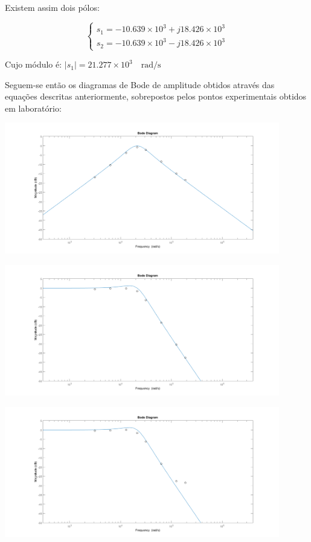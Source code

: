 \documentclass[a4paper,11pt]{report}
\begin{document}
Existem assim dois pólos:

$$
\begin{cases}
s_1=-10.639\times 10^3+j18.426\times 10^3\\
s_2=-10.639\times 10^3-j18.426\times 10^3
\end{cases}
$$

Cujo módulo é: $\left|s_1\right|=21.277\times 10^3 \quad \textrm{rad/s}$

Seguem-se então os diagramas de Bode de amplitude obtidos através das equações descritas anteriormente, sobrepostos pelos pontos experimentais obtidos em laboratório:

\begin{center}
     \includegraphics[angle=0,width=0.9\textwidth]{TTT1exp.png}
     \label{fig:TTT1exp}
     \end{center}

\begin{center}
     \includegraphics[angle=0,width=0.9\textwidth]{TTT2exp.png}
     \label{fig:TTT2exp}
     \end{center}
     
 \begin{center}
     \includegraphics[angle=0,width=0.9\textwidth]{TTT3exp.png}
     \label{fig:TTT3exp}
     \end{center}
\end{document}

